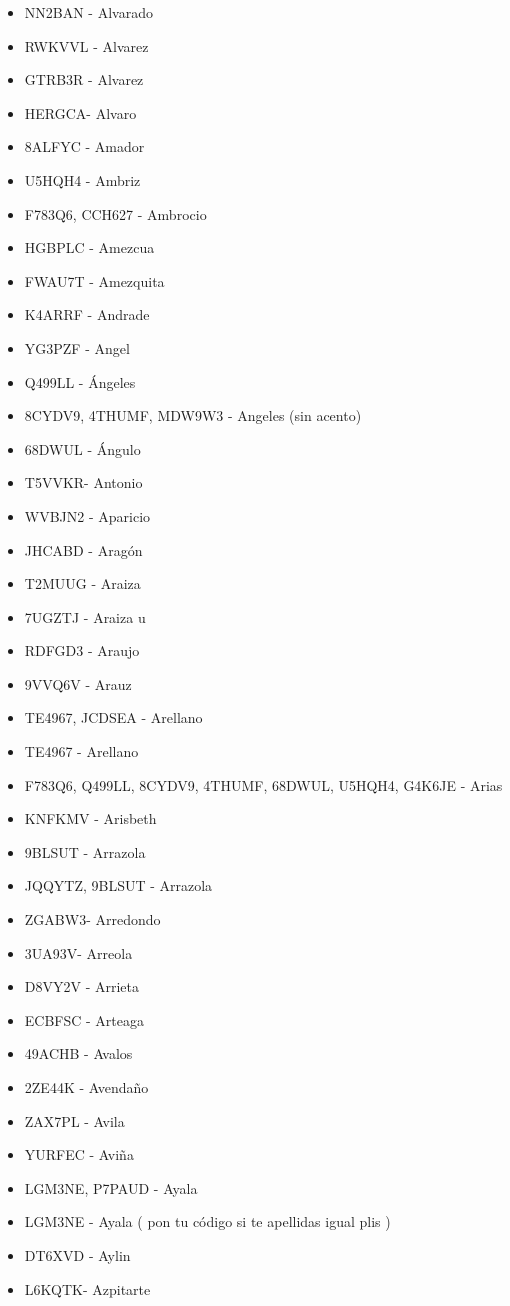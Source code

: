 \begin{itemize}[leftmargin=*,nosep]
\item NN2BAN  -  Alvarado
\item RWKVVL - Alvarez
\item GTRB3R  -  Alvarez
\item HERGCA- Alvaro
\item 8ALFYC - Amador
\item U5HQH4 - Ambriz
\item F783Q6, CCH627 - Ambrocio
\item HGBPLC - Amezcua
\item FWAU7T - Amezquita
\item K4ARRF - Andrade
\item YG3PZF - Angel
\item Q499LL  -  Ángeles
\item 8CYDV9, 4THUMF, MDW9W3 - Angeles (sin acento)
\item 68DWUL  - Ángulo
\item T5VVKR- Antonio
\item WVBJN2 - Aparicio
\item JHCABD  -  Aragón
\item T2MUUG - Araiza
\item 7UGZTJ - Araiza u
\item RDFGD3 - Araujo
\item 9VVQ6V - Arauz
\item TE4967, JCDSEA - Arellano
\item TE4967 - Arellano
\item F783Q6, Q499LL, 8CYDV9, 4THUMF, 68DWUL, U5HQH4, G4K6JE - Arias
\item KNFKMV  -  Arisbeth
\item 9BLSUT - Arrazola
\item JQQYTZ, 9BLSUT - Arrazola
\item ZGABW3- Arredondo
\item 3UA93V- Arreola
\item D8VY2V - Arrieta
\item ECBFSC - Arteaga
\item 49ACHB  -  Avalos
\item 2ZE44K - Avendaño
\item ZAX7PL  -  Avila
\item YURFEC - Aviña
\item LGM3NE, P7PAUD - Ayala
\item LGM3NE - Ayala ( pon tu código si te apellidas igual plis )
\item DT6XVD - Aylin
\item L6KQTK- Azpitarte
\end{itemize}

